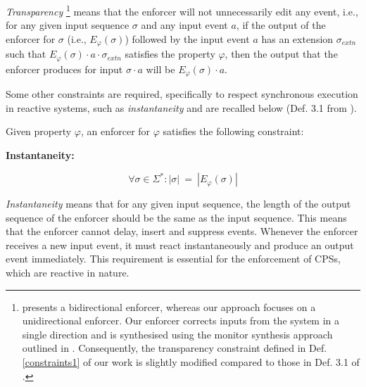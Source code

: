 \textit{Transparency}
\footnote{\cite{pearce_smart_2020} presents a bidirectional enforcer, whereas our approach focuses on a unidirectional enforcer. Our enforcer corrects inputs from the system in a single direction and is synthesised using the monitor synthesis approach outlined in \cite{pearce_smart_2020}. Consequently, the transparency constraint defined in Def. \ref{constraints1} of our work is slightly modified compared to those in Def. 3.1 of \cite{10.1145/3126500}.} 
means that the enforcer will not unnecessarily edit any event, i.e., for any given input sequence $\sigma$ and any input event $a$, if the output of the enforcer for $\sigma$ (i.e., $E_{\varphi} (\sigma)$) followed by the input event $a$ has an extension $\sigma_{extn}$ such
that $E_{\varphi} (\sigma) \cdot a \cdot \sigma_{extn}$ satisfies the property $\varphi$, then the output that the enforcer produces for input
$\sigma \cdot a$ will be $E_{\varphi} (\sigma) \cdot a$.
    

Some other constraints are required, specifically to respect synchronous execution in reactive systems, such as \textit{instantaneity} and are recalled below (Def. 3.1 from \cite{10.1145/3126500}). 
\begin{definition}
 Given property $\varphi$, an enforcer for $\varphi$ satisfies the following constraint:
 \begin{flushleft}
 \textbf{Instantaneity:}
 \end{flushleft}
 \vspace{-1em}
 \begin{equation*}
            \label{eq:Ins}            
 \forall \sigma \in \Sigma^{\ast}: | \sigma | ~=~ | E_{\varphi} (\sigma )|
 \end{equation*}
        \label{constraints2}
\end{definition}
\vspace{-1em}
\textit{Instantaneity} means that for any given input sequence, the length of the output sequence of the enforcer should be the same as the input sequence. This means that the enforcer cannot delay, insert and suppress events. Whenever the enforcer receives a new input event, it must react instantaneously and produce an output event immediately. This requirement is essential for the enforcement of CPSs, which are reactive in nature. 


